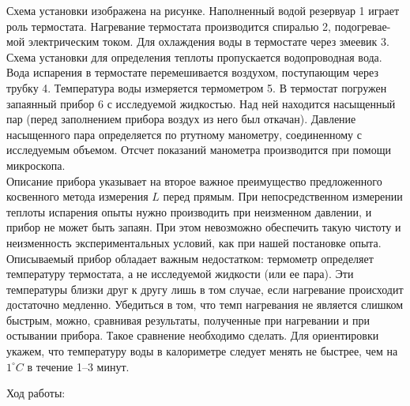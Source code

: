 \documentclass[12pt,a4paper]{article}
\begin{document}
	Схема установки изображена на рисунке. Наполненный водой резервуар 1 играет роль термостата. Нагревание термостата производится спиралью 2, подогревае-
мой электрическим током. Для охлаждения воды в термостате через змеевик 3. Схема установки для определения теплоты пропускается водопроводная вода. Вода испарения в термостате перемешивается воздухом, поступающим через трубку 4. Температура воды измеряется термометром 5. В термостат погружен запаянный прибор 6 с исследуемой жидкостью. Над ней находится насыщенный пар (перед заполнением прибора воздух из него был откачан). Давление насыщенного пара определяется по ртутному манометру, соединенному с исследуемым объемом. Отсчет показаний манометра производится при помощи микроскопа. \\

Описание прибора указывает на второе важное преимущество предложенного косвенного метода измерения $L$ перед прямым. При непосредственном измерении теплоты испарения опыты нужно производить при неизменном давлении, и прибор не может быть запаян. При этом невозможно обеспечить такую чистоту и неизменность экспериментальных условий, как при нашей постановке опыта. \\

Описываемый прибор обладает важным недостатком: термометр определяет температуру термостата, а не исследуемой жидкости (или ее пара). Эти температуры близки друг к другу лишь в том случае, если нагревание происходит достаточно медленно. Убедиться в том, что темп нагревания не является слишком быстрым, можно, сравнивая результаты, полученные при нагревании и при остывании прибора. Такое сравнение необходимо сделать. Для ориентировки укажем, что температуру воды в калориметре следует менять не быстрее, чем на $1^\circ C$ в течение 1–3 минут.  

	\begin{center}
		Ход работы:
	\end{center}
	
\end{document}
